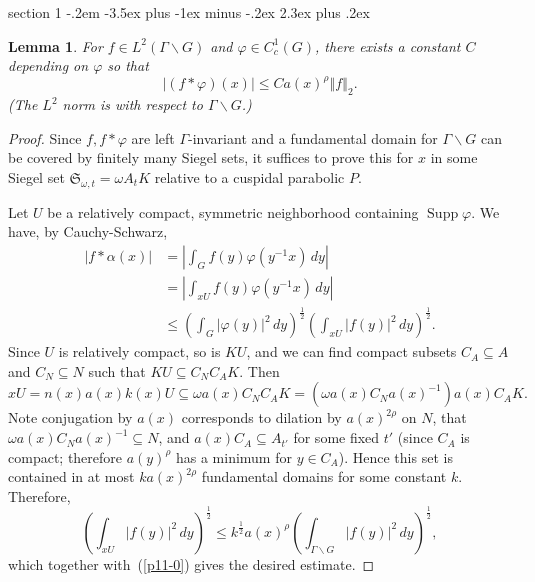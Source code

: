 \documentclass[12pt]{article}
\makeatletter
\theoremstyle{norm}
\newtheorem{lem}[thm]{Lemma}
\newcommand{\rc}[1]{\frac{1}{#1}}
\newcommand{\subeq}[0]{\subseteq}
\newcommand{\al}[0]{\alpha}
\newcommand{\Ga}[0]{\Gamma}
\newcommand{\ph}[0]{\varphi}
\newcommand{\rh}[0]{\rho}
\newcommand{\om}[0]{\omega}
\newcommand{\ab}[1]{\left| {#1} \right|}
\newcommand{\pa}[1]{\left( {#1} \right)}
\newcommand{\ve}[1]{\left\Vert{#1}\right\Vert}
\newcommand{\Supp}{\operatorname{Supp}}
\newcommand{\bs}[0]{\backslash}
\newenvironment{problem}{\@startsection
       {section}
       {1}
       {-.2em}
       {-3.5ex plus -1ex minus -.2ex}
       {2.3ex plus .2ex}
       {\pagebreak[3]%
       \large\bf\noindent{Problem }
       }
       }
       {
       }
\makeatother
\begin{document}
\begin{problem}{\it }
\begin{lem}
For $f\in L^2(\Ga\bs G)$ and $\ph\in C^1_c(G)$, there exists a constant $C$ depending on $\ph$ so that
\[
|(f*\ph)(x)|\le Ca(x)^{\rh}\ve{f}_2.
\]
(The $L^2$ norm is with respect to $\Ga\bs G$.)
\end{lem}
\begin{proof}
Since $f,f*\ph$ are left $\Ga$-invariant and a fundamental domain for $\Ga\bs G$ can be covered by finitely many Siegel sets, it suffices to prove this for $x$ in some Siegel set $\mathfrak S_{\om,t} =\om A_tK$ relative to a cuspidal parabolic $P$.

Let $U$ be a relatively compact, symmetric neighborhood containing $\Supp \ph$. 
We have, by Cauchy-Schwarz,
\begin{align}
\nonumber
|f*\al(x)|&=\ab{\int_G f(y) \ph(y^{-1}x)\,dy}\\
\nonumber
&=\ab{\int_{xU} f(y) \ph(y^{-1}x)\,dy}\\
\label{p11-0}
&\le \pa{\int_G |\ph(y)|^2\,dy}^{\rc 2} \pa{\int_{xU} |f(y)|^2\,dy}^{\rc 2}.
\end{align}
Since $U$ is relatively compact, so is $KU$, and we can find compact subsets $C_A\subeq A$ and $C_N\subeq N$ such that $KU\subeq C_NC_AK$. Then
\[
xU=n(x)a(x)k(x)U
\subeq \om a(x)C_NC_A K
=\pa{\om a(x)C_Na(x)^{-1}} a(x)C_AK.
\]
Note conjugation by $a(x)$ corresponds to dilation by $a(x)^{2\rh}$ on $N$, that $\om a(x)C_Na(x)^{-1}\subeq N$, and $a(x)C_A\subeq A_{t'}$ for some fixed $t'$ (since $C_A$ is compact; therefore $a(y)^{\rho}$ has a minimum for $y\in C_A$). Hence this set is contained in at most $ka(x)^{2\rho}$ fundamental domains for some constant $k$. Therefore,
\[
\pa{\int_{xU} |f(y)|^2\,dy}^{\rc 2}\le k^{\rc 2} a(x)^{\rh} \pa{\int_{\Ga\bs G} |f(y)|^2\,dy}^{\rc 2},
\]
which together with~(\ref{p11-0}) gives the desired estimate.
\end{proof}


\end{problem}
\end{document}
